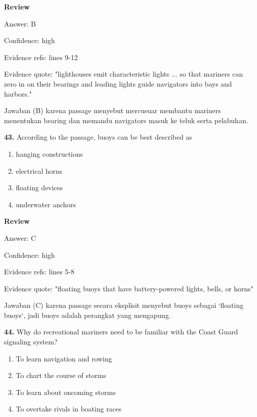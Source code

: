 \documentclass[12pt]{article}
\begin{document}
\par
\begingroup
\setlength{\parskip}{0pt}
\setlength{\parindent}{0pt}
\textbf{Review}\par
Answer: B\par
Confidence: high\par
Evidence refs: lines 9-12\par
Evidence quote: "lighthouses emit characteristic lights ... so that mariners can zero in on their bearings and leading lights guide navigators into bays and harbors."\par
Jawaban (B) karena passage menyebut mercusuar membantu mariners menentukan bearing dan memandu navigators masuk ke teluk serta pelabuhan.\par
\endgroup
\par
\vspace{0.25\baselineskip}
\noindent\textbf{43.} According to the passage, buoys can be best described as
\begin{enumerate}[label=(\Alph*),leftmargin=*,itemsep=0.2em]
\item hanging constructions
\item electrical horns
\item floating devices
\item underwater anchors
\end{enumerate}
\par
\begingroup
\setlength{\parskip}{0pt}
\setlength{\parindent}{0pt}
\textbf{Review}\par
Answer: C\par
Confidence: high\par
Evidence refs: lines 5-8\par
Evidence quote: "floating buoys that have battery-powered lights, bells, or horns"\par
Jawaban (C) karena passage secara eksplisit menyebut buoys sebagai `floating buoys`, jadi buoys adalah perangkat yang mengapung.\par
\endgroup
\par
\vspace{0.25\baselineskip}
\noindent\textbf{44.} Why do recreational mariners need to be familiar with the Coast Guard signaling system?
\begin{enumerate}[label=(\Alph*),leftmargin=*,itemsep=0.2em]
\item To learn navigation and rowing
\item To chart the course of storms
\item To learn about oncoming storms
\item To overtake rivals in boating races
\end{enumerate}
\end{document}
